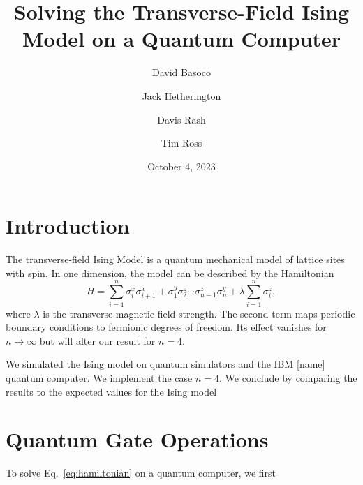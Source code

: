 \documentclass[12pt]{article}
\title{Solving the Transverse-Field Ising Model on a Quantum Computer}
\author{David Basoco \and Jack Hetherington \and Davis Rash \and Tim Ross}
\date{October 4, 2023}
\begin{document}
  \maketitle


  \section{Introduction}
  The transverse-field Ising Model is a quantum mechanical model of lattice sites with spin. In one dimension, the model can be described by the Hamiltonian
  \begin{equation}
    \label{eq:hamiltonian}
    H = \sum_{i = 1}^{n} \sigma_{i}^{x} \sigma_{i + 1}^{x}
        + \sigma_{1}^{y} \sigma_{2}^{z} \dotsm \sigma_{n - 1}^{z} \sigma_{n}^{y}
        + \lambda \sum_{i = 1}^{n} \sigma_{i}^{z},
  \end{equation}
  where \( \lambda \) is the transverse magnetic field strength. The second term maps periodic boundary conditions to fermionic degrees of freedom. Its effect vanishes for \( n \to \infty \) but will alter our result for \( n = 4 \).

  We simulated the Ising model on quantum simulators and the IBM [name] quantum computer. We implement the case \( n = 4 \). We conclude by comparing the results to the expected values for the Ising model %

  \section{Quantum Gate Operations}
  To solve Eq.~\eqref{eq:hamiltonian} on a quantum computer, we first
\end{document}
